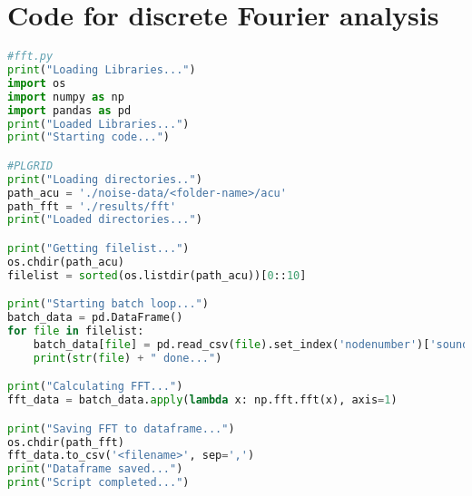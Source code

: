 \chapter{Code for discrete Fourier analysis} %

\label{codefft} %


\begin{lstlisting}[language=Python]
#fft.py
print("Loading Libraries...")
import os
import numpy as np
import pandas as pd
print("Loaded Libraries...")
print("Starting code...")

#PLGRID
print("Loading directories..")
path_acu = './noise-data/<folder-name>/acu'
path_fft = './results/fft'
print("Loaded directories...")

print("Getting filelist...")
os.chdir(path_acu)
filelist = sorted(os.listdir(path_acu))[0::10]

print("Starting batch loop...")
batch_data = pd.DataFrame()
for file in filelist:
    batch_data[file] = pd.read_csv(file).set_index('nodenumber')['sound-pressure']
    print(str(file) + " done...")

print("Calculating FFT...")
fft_data = batch_data.apply(lambda x: np.fft.fft(x), axis=1)

print("Saving FFT to dataframe...")
os.chdir(path_fft)
fft_data.to_csv('<filename>', sep=',')
print("Dataframe saved...")
print("Script completed...")
\end{lstlisting}